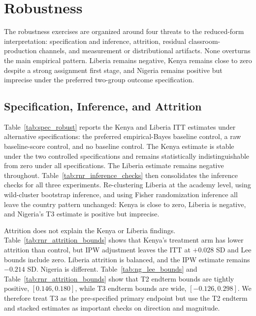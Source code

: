 \documentclass[11pt]{article}
\begin{document}
\section{Robustness}
\label{sec:robustness}

The robustness exercises are organized around four threats to the reduced-form interpretation: specification and inference, attrition, residual classroom-production channels, and measurement or distributional artifacts. None overturns the main empirical pattern. Liberia remains negative, Kenya remains close to zero despite a strong assignment first stage, and Nigeria remains positive but imprecise under the preferred two-group outcome specification.

\subsection{Specification, Inference, and Attrition}

Table~\ref{tab:spec_robust} reports the Kenya and Liberia ITT estimates under alternative specifications: the preferred empirical-Bayes baseline control, a raw baseline-score control, and no baseline control. The Kenya estimate is stable under the two controlled specifications and remains statistically indistinguishable from zero under all specifications. The Liberia estimate remains negative throughout. Table~\ref{tab:rnr_inference_checks} then consolidates the inference checks for all three experiments. Re-clustering Liberia at the academy level, using wild-cluster bootstrap inference, and using Fisher randomization inference all leave the country pattern unchanged: Kenya is close to zero, Liberia is negative, and Nigeria's T3 estimate is positive but imprecise.

Attrition does not explain the Kenya or Liberia findings. Table~\ref{tab:rnr_attrition_bounds} shows that Kenya's treatment arm has lower attrition than control, but IPW adjustment leaves the ITT at $+0.028$ SD and Lee bounds include zero. Liberia attrition is balanced, and the IPW estimate remains $-0.214$ SD. Nigeria is different. Table~\ref{tab:ng_lee_bounds} and Table~\ref{tab:rnr_attrition_bounds} show that T2 endterm bounds are tightly positive, $[0.146,0.180]$, while T3 endterm bounds are wide, $[-0.126,0.298]$. We therefore treat T3 as the pre-specified primary endpoint but use the T2 endterm and stacked estimates as important checks on direction and magnitude.
\end{document}

